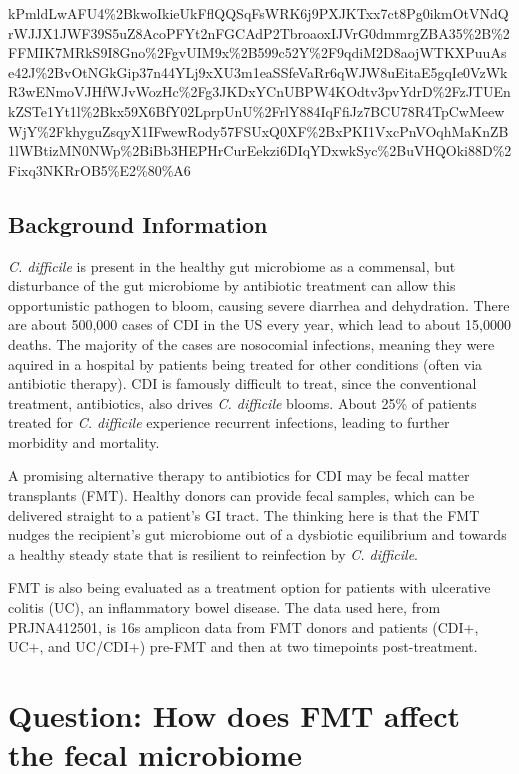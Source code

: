 \documentclass[11pt]{article}
\begin{document}
kPmldLwAFU4\%2BkwoIkieUkFflQQSqFsWRK6j9PXJKTxx7ct8Pg0ikmOtVNdQrWJJX1JWF39S5uZ8AcoPFYt2nFGCAdP2TbroaoxIJVrG0dmmrgZBA35\%2B\%2FFMIK7MRkS9I8Gno\%2FgvUIM9x\%2B599c52Y\%2F9qdiM2D8aojWTKXPuuAse42J\%2BvOtNGkGip37n44YLj9xXU3m1eaSSfeVaRr6qWJW8uEitaE5gqIe0VzWkR3wENmoVJHfWJvWozHc\%2Fg3JKDxYCnUBPW4KOdtv3pvYdrD\%2FzJTUEnkZSTe1Yt1l\%2Bkx59X6BfY02LprpUnU\%2FrlY884IqFfiJz7BCU78R4TpCwMeewWjY\%2FkhyguZsqyX1IFwewRody57FSUxQ0XF\%2BxPKI1VxcPnVOqhMaKnZB1lWBtizMN0NWp\%2BiBb3HEPHrCurEekzi6DIqYDxwkSyc\%2BuVHQOki88D\%2Fixq3NKRrOB5\%E2\%80\%A6

    \hypertarget{background-information}{%
\subsection{Background Information}\label{background-information}}

\emph{C. difficile} is present in the healthy gut microbiome as a
commensal, but disturbance of the gut microbiome by antibiotic treatment
can allow this opportunistic pathogen to bloom, causing severe diarrhea
and dehydration. There are about 500,000 cases of CDI in the US every
year, which lead to about 15,0000 deaths. The majority of the cases are
nosocomial infections, meaning they were aquired in a hospital by
patients being treated for other conditions (often via antibiotic
therapy). CDI is famously difficult to treat, since the conventional
treatment, antibiotics, also drives \emph{C. difficile} blooms. About
25\% of patients treated for \emph{C. difficile} experience recurrent
infections, leading to further morbidity and mortality.

A promising alternative therapy to antibiotics for CDI may be fecal
matter transplants (FMT). Healthy donors can provide fecal samples,
which can be delivered straight to a patient's GI tract. The thinking
here is that the FMT nudges the recipient's gut microbiome out of a
dysbiotic equilibrium and towards a healthy steady state that is
resilient to reinfection by \emph{C. difficile}.

FMT is also being evaluated as a treatment option for patients with
ulcerative colitis (UC), an inflammatory bowel disease. The data used
here, from PRJNA412501, is 16s amplicon data from FMT donors and
patients (CDI+, UC+, and UC/CDI+) pre-FMT and then at two timepoints
post-treatment.

\hypertarget{question-how-does-fmt-affect-the-fecal-microbiome}{%
\section{Question: How does FMT affect the fecal
microbiome}\label{question-how-does-fmt-affect-the-fecal-microbiome}}
\end{document}

